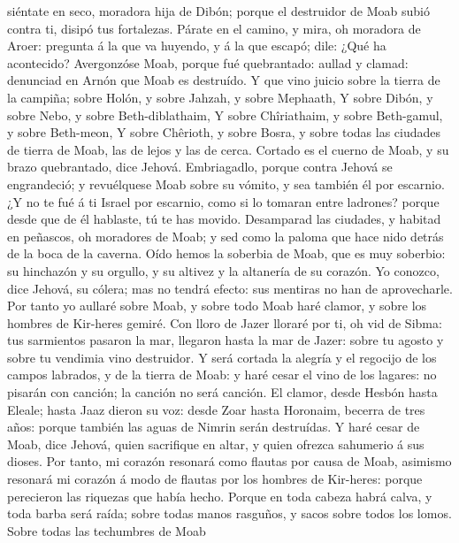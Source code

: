 siéntate en seco, moradora hija de Dibón; porque el destruidor de Moab
subió contra ti, disipó tus fortalezas.  Párate en el
camino, y mira, oh moradora de Aroer: pregunta á la que va huyendo, y á
la que escapó; dile: ¿Qué ha acontecido?  Avergonzóse Moab,
porque fué quebrantado: aullad y clamad: denunciad en Arnón que Moab es
destruído.  Y que vino juicio sobre la tierra de la
campiña; sobre Holón, y sobre Jahzah, y sobre Mephaath,  Y
sobre Dibón, y sobre Nebo, y sobre Beth-diblathaim,  Y
sobre Chîriathaim, y sobre Beth-gamul, y sobre Beth-meon, 
Y sobre Chêrioth, y sobre Bosra, y sobre todas las ciudades de tierra de
Moab, las de lejos y las de cerca.  Cortado es el cuerno de
Moab, y su brazo quebrantado, dice Jehová.  Embriagadlo,
porque contra Jehová se engrandeció; y revuélquese Moab sobre su vómito,
y sea también él por escarnio.  ¿Y no te fué á ti Israel
por escarnio, como si lo tomaran entre ladrones? porque desde que de él
hablaste, tú te has movido.  Desamparad las ciudades, y
habitad en peñascos, oh moradores de Moab; y sed como la paloma que hace
nido detrás de la boca de la caverna.  Oído hemos la
soberbia de Moab, que es muy soberbio: su hinchazón y su orgullo, y su
altivez y la altanería de su corazón.  Yo conozco, dice
Jehová, su cólera; mas no tendrá efecto: sus mentiras no han de
aprovecharle.  Por tanto yo aullaré sobre Moab, y sobre
todo Moab haré clamor, y sobre los hombres de Kir-heres gemiré.
 Con lloro de Jazer lloraré por ti, oh vid de Sibma: tus
sarmientos pasaron la mar, llegaron hasta la mar de Jazer: sobre tu
agosto y sobre tu vendimia vino destruidor.  Y será cortada
la alegría y el regocijo de los campos labrados, y de la tierra de Moab:
y haré cesar el vino de los lagares: no pisarán con canción; la canción
no será canción.  El clamor, desde Hesbón hasta Eleale;
hasta Jaaz dieron su voz: desde Zoar hasta Horonaim, becerra de tres
años: porque también las aguas de Nimrin serán destruídas. 
Y haré cesar de Moab, dice Jehová, quien sacrifique en altar, y quien
ofrezca sahumerio á sus dioses.  Por tanto, mi corazón
resonará como flautas por causa de Moab, asimismo resonará mi corazón á
modo de flautas por los hombres de Kir-heres: porque perecieron las
riquezas que había hecho.  Porque en toda cabeza habrá
calva, y toda barba será raída; sobre todas manos rasguños, y sacos
sobre todos los lomos.  Sobre todas las techumbres de Moab
